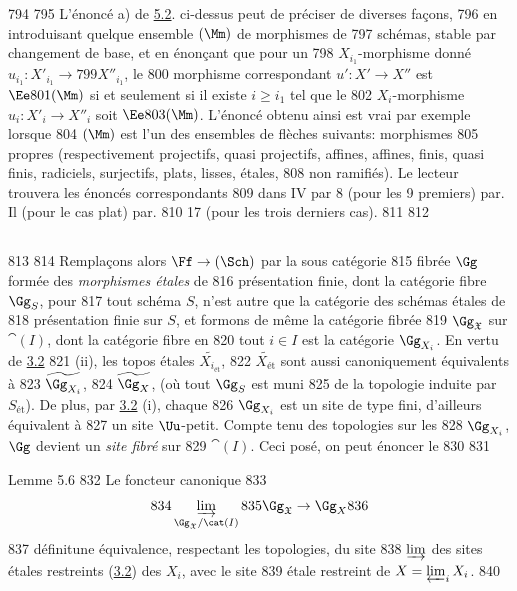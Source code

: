    794	
   795	L'énoncé a) de \hyperref[VII.subsec5.2]{5.2}. ci-dessus peut de préciser de diverses façons,
   796	en introduisant quelque ensemble $(\Mm)$ de morphismes de
   797	schémas, stable par changement de base, et en énonçant que pour un
   798	$X_{i_1}$-morphisme donné\pageoriginale $u_{i_1} : X'_{i_1} \to
   799	X''_{i_1}$, le
   800	morphisme correspondant $u': X'\to X''$ est $\Ee
   801	(\Mm)$ si et seulement si il existe $i\geq i_{1}$ tel que le
   802	$X_{i}$-morphisme $u_{i}:X'_{i}\to X''_{i}$ soit $\Ee
   803	(\Mm)$. L'énoncé obtenu ainsi est vrai par exemple lorsque
   804	$(\Mm)$ est l'un des ensembles de flèches suivants: morphismes
   805	propres (respectivement projectifs, \resp quasi projectifs, 	affines, \resp affines, \resp finis, \resp quasi finis, 	radiciels, \resp surjectifs, \resp plats, \resp lisses, \resp étales,
   808	\resp non ramifiés). Le lecteur trouvera les énoncés correspondants
   809	dans \EGA IV par 8 (pour les 9 premiers) par. Il (pour le cas plat) par.
   810	17 (pour les trois derniers cas).
   811	
   812	\subsection{}
   813	
   814	Remplaçons alors $\Ff \to (\Sch)$ par la sous catégorie
   815	fibrée $\Gg$ formée des \emph{morphismes étales} de
   816	présentation finie, dont la catégorie fibre $\Gg_{S}$, pour
   817	tout schéma $S$, n'est autre que la catégorie des schémas étales de
   818	présentation finie sur $S$, et formons de même la catégorie fibrée
   819	$\Gg_{\mathfrak{X}}$ sur $\cat(I)$, dont la catégorie fibre en
   820	tout $i \in I$ est la catégorie $\Gg_{X_i}$. En vertu de \hyperref[VII.cor3.2]{3.2}
   821	(ii), les topos étales $\widetilde{X_{i_{\text{ét}}}}$,
   822	$\widetilde{X_{\text{ét}}}$ sont aussi canoniquement équivalents à
   823	$\widetilde{\Gg_{X_{i}}}$,
   824	$\widetilde{\Gg_{X}}$, (où tout $\Gg_S$ est muni
   825	de la topologie induite par $S_{\text{ét}}$). De plus, par \hyperref[VII.cor3.2]{3.2} (i), chaque
   826	$\Gg_{X_i}$ est un site de type fini, d'ailleurs équivalent à
   827	un site $\Uu$-petit. Compte tenu des topologies sur les
   828	$\Gg_{X_i}$, $\Gg$ devient un \emph{site fibré} sur
   829	$\cat(I)$. Ceci posé, on peut énoncer le
   830	
   831	\begin{enonce*}{Lemme 5.6}
   832	Le foncteur canonique
   833	$$
   834	\varinjlim_{\Gg_\mathfrak{X}/\cat(I)}
   835	\Gg_\mathfrak{X} \to \Gg_X
   836	$$
   837	définit\pageoriginale une équivalence, respectant les topologies, du site
   838	$\varinjlim$ des sites étales restreints (\hyperref[VII.cor3.2]{3.2}) des $X_i$, avec le site
   839	étale restreint de $X = \varprojlim_i X_i$.
   840	\end{enonce*}
